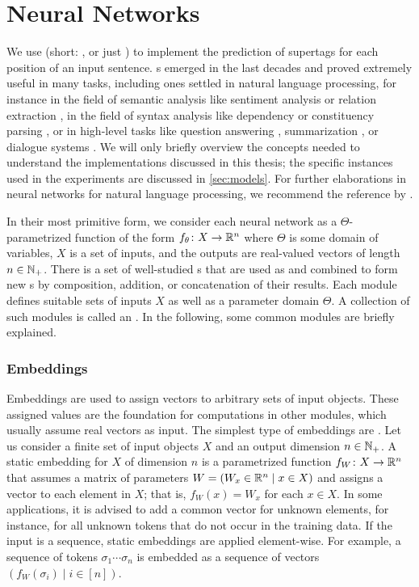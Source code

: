 \documentclass[../document.tex]{subfiles}
\begin{document}
    \section{Neural Networks}\label{sec:preliminaries:nn}
    We use  (short: , or just ) to implement the prediction of supertags for each position of an input sentence.
    s emerged in the last decades and proved extremely useful in many tasks, including ones settled in natural language processing, for instance in the field of semantic analysis like sentiment analysis \citep{sentiment} or relation extraction \citep{relationextraction}, in the field of syntax analysis like dependency \citep{dependencyparsing} or constituency parsing \citep{FerGom20a}, or in high-level tasks like question answering \citep{Devlin2019}, summarization \citep{bertgeneration}, or dialogue systems \citep{dialoguesystems}.
    We will only briefly overview the concepts needed to understand the implementations discussed in this thesis; the specific instances used in the experiments are discussed in \cref{sec:models}.
    For further elaborations in neural networks for natural language processing, we recommend the reference by \citet{Gol22}.

    In their most primitive form, we consider each neural network as a \(\varTheta\)-parametrized function of the form \(f_\theta\colon X \to \mathbb{R}^n\) where \(\varTheta\) is some domain of variables, \(X\) is a set of inputs, and the outputs are real-valued vectors of length \(n \in \mathbb{N}_+\).
    There is a set of well-studied s that are used as  and combined to form new s by composition, addition, or concatenation of their results.
    Each module defines suitable sets of inputs \(X\) as well as a parameter domain \(\varTheta\). 
    A collection of such modules is called an .
    In the following, some common modules are briefly explained.

    \subsubsection{Embeddings}
    Embeddings are used to assign vectors to arbitrary sets of input objects.
    These assigned values are the foundation for computations in other modules, which usually assume real vectors as input.
    The simplest type of embeddings are .
    Let us consider a finite set of input objects \(X\) and an output dimension \(n \in \mathbb{N}_+\).
    A static embedding for \(X\) of dimension \(n\) is a parametrized function \(f_W\colon X \to \mathbb{R}^n\) that assumes a matrix of parameters \(W = (W_x \in \mathbb{R}^n \mid x \in X)\) and assigns a vector to each element in \(X\); that is, \(f_W(x) = W_{x}\) for each \(x \in X\).
    In some applications, it is advised to add a common vector for unknown elements, for instance, for all unknown tokens that do not occur in the training data.
    If the input is a sequence, static embeddings are applied element-wise.
    For example, a sequence of tokens \(\sigma_1 \cdots \sigma_n\) is embedded as a sequence of vectors \((f_W(\sigma_i) \mid i \in [n])\).
\end{document}
